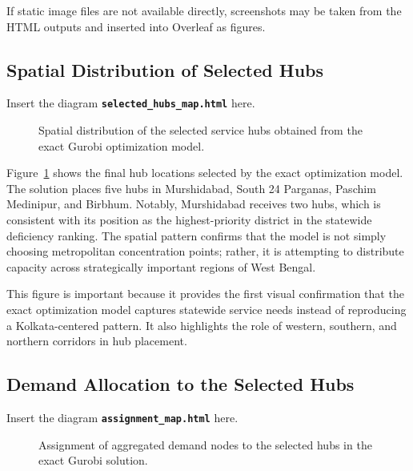 If static image files are not available directly, screenshots may be taken from the HTML outputs and inserted into Overleaf as figures.

\subsection{Spatial Distribution of Selected Hubs}

Insert the diagram \textbf{\texttt{selected\_hubs\_map.html}} here.

\begin{figure}[h!]
\centering
\caption{Spatial distribution of the selected service hubs obtained from the exact Gurobi optimization model.}
\label{fig:gurobi_selected_hubs_map}
\end{figure}

Figure~\ref{fig:gurobi_selected_hubs_map} shows the final hub locations selected by the exact optimization model. The solution places five hubs in Murshidabad, South 24 Parganas, Paschim Medinipur, and Birbhum. Notably, Murshidabad receives two hubs, which is consistent with its position as the highest-priority district in the statewide deficiency ranking. The spatial pattern confirms that the model is not simply choosing metropolitan concentration points; rather, it is attempting to distribute capacity across strategically important regions of West Bengal.

This figure is important because it provides the first visual confirmation that the exact optimization model captures statewide service needs instead of reproducing a Kolkata-centered pattern. It also highlights the role of western, southern, and northern corridors in hub placement.

\subsection{Demand Allocation to the Selected Hubs}

Insert the diagram \textbf{\texttt{assignment\_map.html}} here.

\begin{figure}[h!]
\centering
\caption{Assignment of aggregated demand nodes to the selected hubs in the exact Gurobi solution.}
\label{fig:gurobi_assignment_map}
\end{figure}

